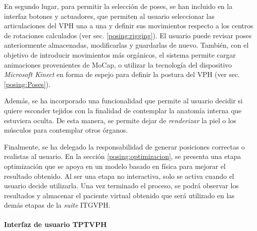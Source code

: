 En segundo lugar, para permitir la selección de poses, se han incluido en la interfaz botones y actuadores, que permiten al usuario seleccionar las articulaciones del \ac{VPH} una a una y definir sus movimientos respecto a los centros de rotaciones calculados (ver sec. \ref{posing:rigging}). El usuario puede revisar poses anteriormente almacenadas, modificarlas y guardarlas de nuevo. También, con el objetivo de introducir movimientos más orgánicos, el sistema permite cargar animaciones provenientes de \ac{MoCap}, o utilizar la tecnología del dispositivo \emph{Microsoft Kinect} en forma de espejo para definir la postura del \ac{VPH} (ver sec. \ref{posing:Poses}).

Además, se ha incorporado una funcionalidad que permite al usuario decidir si quiere esconder tejidos con la finalidad de contemplar la anatomía interna que estuviera oculta. De esta manera, se permite dejar de \emph{renderizar} la piel o los músculos para contemplar otros órganos.%

Finalmente, se ha delegado la responsabilidad de generar posiciones correctas o realistas al usuario. En la sección \ref{posing:optimizacion}, se presenta una etapa optimización que se apoya en un modelo basado en física para mejorar el resultado obtenido. Al ser una etapa no interactiva, solo se activa cuando el usuario decide utilizarla. Una vez terminado el proceso, se podrá observar los resultados y almacenar el paciente virtual obtenido que será utilizado en las demás etapas de la \emph{suite} \ac{ITGVPH}.  


\paragraph{Interfaz de usuario \ac{TPTVPH}}\mbox{}\\



